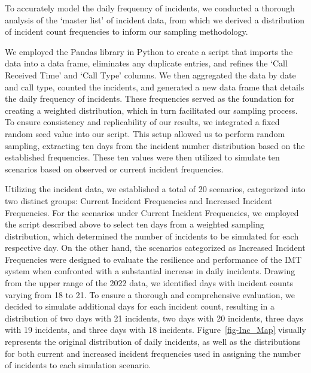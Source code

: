 \documentclass[
  letterpaper,
  authoryear]{elsarticle}
\begin{document}
To accurately model the daily frequency of incidents, we conducted a
thorough analysis of the `master list' of incident data, from which we
derived a distribution of incident count frequencies to inform our
sampling methodology.

We employed the Pandas library in Python to create a script that imports
the data into a data frame, eliminates any duplicate entries, and
refines the `Call Received Time' and `Call Type' columns. We then
aggregated the data by date and call type, counted the incidents, and
generated a new data frame that details the daily frequency of
incidents. These frequencies served as the foundation for creating a
weighted distribution, which in turn facilitated our sampling process.
To ensure consistency and replicability of our results, we integrated a
fixed random seed value into our script. This setup allowed us to
perform random sampling, extracting ten days from the incident number
distribution based on the established frequencies. These ten values were
then utilized to simulate ten scenarios based on observed or current
incident frequencies.

Utilizing the incident data, we established a total of 20 scenarios,
categorized into two distinct groups: Current Incident Frequencies and
Increased Incident Frequencies. For the scenarios under Current Incident
Frequencies, we employed the script described above to select ten days
from a weighted sampling distribution, which determined the number of
incidents to be simulated for each respective day. On the other hand,
the scenarios categorized as Increased Incident Frequencies were
designed to evaluate the resilience and performance of the IMT system
when confronted with a substantial increase in daily incidents. Drawing
from the upper range of the 2022 data, we identified days with incident
counts varying from 18 to 21. To ensure a thorough and comprehensive
evaluation, we decided to simulate additional days for each incident
count, resulting in a distribution of two days with 21 incidents, two
days with 20 incidents, three days with 19 incidents, and three days
with 18 incidents. Figure~\ref{fig-Inc_Map} visually represents the
original distribution of daily incidents, as well as the distributions
for both current and increased incident frequencies used in assigning
the number of incidents to each simulation scenario.
\end{document}
